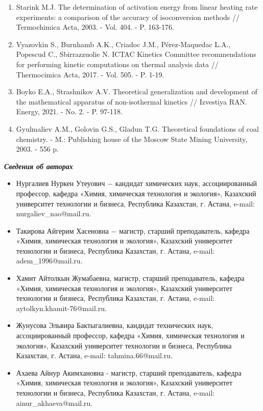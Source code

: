\begin{enumerate}
\item
Starink M.J. The determination of activation energy from linear
heating rate experiments: a comparison of the accuracy of isoconversion
methods // Termochimica Acta, 2003. - Vol. 404. - P. 163-176.

\item
Vyazovkin S., Burnhamb A.K., Criadoc J.M., Pérez-Maquedac L.A.,
Popescud C., Sbirrazzuolie N. ICTAC Kinetics Committee recommendations
for performing kinetic computations on thermal analysis data //
Thermocimica Acta, 2017. - Vol. 505. - P. 1-19.

\item
Boyko E.A., Strashnikov A.V. Theoretical generalization and
development of the mathematical apparatus of non-isothermal kinetics //
Izvestiya RAN. Energy, 2021. - No. 2. - P. 97-118.

\item
Gyulmaliev A.M., Golovin G.S., Gladun T.G. Theoretical foundations
of coal chemistry. - M.: Publishing house of the Moscow State Mining
University, 2003. - 556 p.
\end{enumerate}

\emph{{\bfseries Сведения об авторах}}

\begin{itemize}
\item
Нургалиев Нуркен Утеуович − кандидат химических наук, ассоциированный
профессор, кафедра «Химия, химическая технология и экология», Казахский
университет технологии и бизнеса, Республика Казахстан, г. Астана,
e-mail:
nurgaliev\_nao@mail.ru.

\item
Такирова Айгерим Хасеновна − магистр, старший преподаватель, кафедра
«Химия, химическая технология и экология», Казахский университет
технологии и бизнеса, Республика Казахстан, г. Астана, e-mail:
adem\_1996@mail.ru.

\item
Хамит Айтолкын Жумабаевна, магистр, старший преподаватель, кафедра
«Химия, химическая технология и экология», Казахский университет
технологии и бизнеса, Республика Казахстан, г. Астана, e-mail:
aytolkyn.khamit-76@mail.ru.

\item
Жунусова Эльвира Бактыгалиевна, кандидат технических наук,
ассоциированный профессор, кафедра «Химия, химическая технология и
экология», Казахский университет технологии и бизнеса, Республика
Казахстан, г. Астана, e-mail:
tahmina.66@mail.ru.

\item
Ахаева Айнур Акимхановна - магистр, старший преподаватель, кафедра
«Химия, химическая технология и экология», Казахский университет
технологии и бизнеса, Республика Казахстан, г. Астана, e-mail:
ainur\_akhaeva@mail.ru.
\end{itemize}

